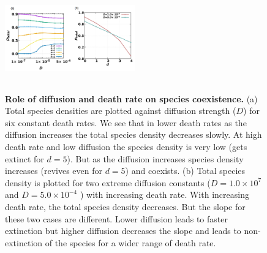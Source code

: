 \documentclass[aps, pre, twocolumn, amsmath, superscriptaddress,showkeys,showpacs]{revtex4-1}
\begin{document}

	
		\begin{figure}
		\includegraphics[width=0.5\textwidth, height=4.5cm]{Diagram2.png}
		\caption{{\bf Role of diffusion and death rate on species coexistence.} (a) Total species densities are plotted against diffusion strength ($D$) for six constant death rates. We see that in lower death rates as the diffusion increases the total species density decreases slowly. At high death rate and low diffusion the species density is very low (gets extinct for $d=5$). But as the diffusion increases species density increases (revives even for $d=5$) and coexists. 
			(b) Total species density is plotted for two extreme diffusion constants ($ D=1.0\times 10^{7}$ and $ D=5.0\times 10^{-4}$ ) with increasing death rate. With increasing death rate, the total species density decreases. But the slope for these two cases are different. Lower diffusion leads to faster extinction but higher diffusion decreases the slope and leads to non-extinction of the species for a wider range of death rate.}
		\label{fig2-speciesdensity}
	\end{figure}
\end{document}
